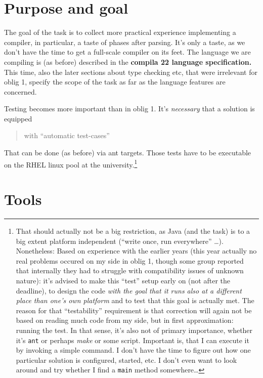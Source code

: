 \documentclass[11pt,freeform]{handout}[2014/08/13]
\begin{document}
\section{Purpose and goal}
\label{sec:x}

The goal of the task is to collect more practical experience implementing a
compiler, in particular, a taste of phases after parsing. It's only a
taste, as we don't have the time to get a full-scale compiler on its
feet. The language we are compiling is (as before) described in the
\textbf{compila 22 language specification.} This time, also the later
sections about type checking etc, that were irrelevant for oblig 1, specify
the scope of the task as far as the language features are concerned.


Testing becomes more important than in oblig 1. It's \emph{necessary} that
a solution is equipped


\begin{quote}
  with ``automatic test-cases''
\end{quote}

That can be done (as before) via ant targets. Those tests have to be
executable on the RHEL linux pool at the university.\footnote{That should
  actually not be a big restriction, as Java (and the task) is to a big
  extent platform independent (``write once, run everywhere''
  \ldots). Nonetheless: Based on experience with the earlier years (this
  year actually no real problems occured on my side in oblig 1, though some
  group reported that internally they had to struggle with compatibility
  issues of unknown nature): it's advised to make this ``test'' setup early
  on (not after the deadline), to design the code \emph{with the goal that
    it runs also at a different place than one's own platform} and to test
  that this goal is actually met. The reason for that ``testability''
  requirement is that correction will again not be based on reading much
  code from my side, but in first approximation: running the test. In that
  sense, it's also not of primary importance, whether it's \texttt{ant} or
  perhaps \emph{make} or some script. Important is, that I can execute it
  by invoking a simple command.  I don't have the time to figure out how
  one particular solution is configured, started, etc. I don't even want to
  look around and try whether I find a \texttt{main} method somewhere\ldots
}


\section{Tools}
\end{document}
